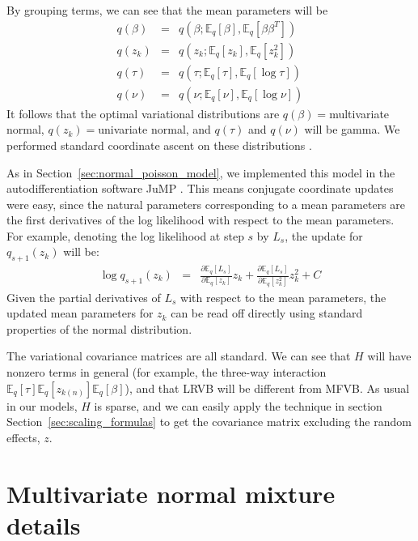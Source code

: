 \documentclass{article}\usepackage[]{graphicx}\usepackage[]{color}
\newcommand{\mysec}[1]{Section~\ref{sec:#1}}
\newcommand{\constant}{C} %
\newcommand{\mbeq}{\mathbb{E}_{q}}
\begin{document}
%
By grouping terms, we can see that the mean parameters will be
%
\begin{eqnarray*}
q\left(\beta\right) & = & q\left(\beta;\mbeq\left[\beta\right],\mbeq\left[\beta\beta^{T}\right]\right)\\
q\left(z_{k}\right) & = & q\left(z_{k};\mbeq\left[z_{k}\right],\mbeq\left[z_{k}^{2}\right]\right)\\
q\left(\tau\right) & = & q\left(\tau;\mbeq\left[\tau\right],\mbeq\left[\log\tau\right]\right)\\
q\left(\nu\right) & = & q\left(\nu;\mbeq\left[\nu\right],\mbeq\left[\log\nu\right]\right)
\end{eqnarray*}
%
It follows that the optimal variational distributions are $q\left(\beta\right)=$multivariate
normal, $q\left(z_{k}\right)=$univariate normal, and $q\left(\tau\right)$
and $q\left(\nu\right)$ will be gamma. We performed standard coordinate
ascent on these distributions \citep{bishop:2006:pattern}.

As in \mysec{normal_poisson_model}, we implemented this model in the
autodifferentiation software JuMP \citep{JuMP:LubinDunningIJOC}.
This means conjugate coordinate updates were easy, since the natural
parameters corresponding to a mean parameters are the first derivatives
of the log likelihood with respect to the mean parameters. For example,
denoting the log likelihood at step $s$ by $L_{s}$, the update for
$q_{s+1}\left(z_{k}\right)$ will be:
%
\begin{eqnarray*}
\log q_{s+1}\left(z_{k}\right) & = & \frac{\partial\mbeq\left[L_{s}\right]}{\partial\mbeq\left[z_{k}\right]}z_{k}+\frac{\partial\mbeq\left[L_{s}\right]}{\partial\mbeq\left[z_{k}^{2}\right]}z_{k}^{2}+\constant
\end{eqnarray*}
%
Given the partial derivatives of $L_{s}$ with respect to the mean
parameters, the updated mean parameters for $z_{k}$ can be read off
directly using standard properties of the normal distribution.

The variational covariance matrices are all standard. We can see that
$H$ will have nonzero terms in general (for example, the three-way
interaction $\mbeq\left[\tau\right]\mbeq\left[z_{k\left(n\right)}\right]\mbeq\left[\beta\right]$),
and that LRVB will be different from MFVB. As usual in our models,
$H$ is sparse, and we can easily apply the technique in section \mysec{scaling_formulas}
to get the covariance matrix excluding the random effects, $z$.

\section{Multivariate normal mixture details} \label{app:mvn_details}
\end{document}
